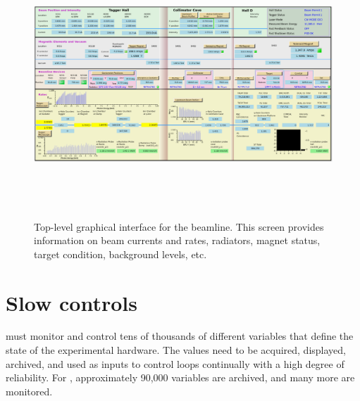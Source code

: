 
\begin{landscape}
\begin{figure}[tbp]
\begin{center}

\includegraphics[height=10cm,clip=true]{figures/GlueX_CSS_overview.png}
\caption{Top-level graphical interface for the beamline. This screen provides information on beam currents and rates, radiators, magnet status, target condition, background levels, etc.
\label{fig:GlueX_CSS_overview}
}
\end{center}
\end{figure}
\end{landscape}

\section[Slow controls]{Slow controls \label{sec:controls}}
\GX{} must monitor 
and control tens of thousands of different variables that define the state of the experimental hardware. The values need to be acquired, displayed, archived, and used as inputs to control loops continually with a high degree of reliability. For \gx, approximately 90,000 variables are archived, and many more are monitored.

